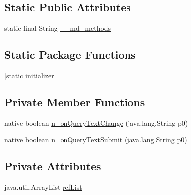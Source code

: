\subsection*{Static Public Attributes}
\begin{CompactItemize}
\item 
static final String \hyperlink{classmd5b60ffeb829f638581ab2bb9b1a7f4f3f_1_1_search_bar_renderer_5f0e642da7b2413e781c8137331a275e}{\_\-\_\-md\_\-methods}
\end{CompactItemize}
\subsection*{Static Package Functions}
\begin{CompactItemize}
\item 
\hyperlink{classmd5b60ffeb829f638581ab2bb9b1a7f4f3f_1_1_search_bar_renderer_ea4b7a40383fa8ec0f5ea4d35a208d21}{\mbox{[}static initializer\mbox{]}}
\end{CompactItemize}
\subsection*{Private Member Functions}
\begin{CompactItemize}
\item 
native boolean \hyperlink{classmd5b60ffeb829f638581ab2bb9b1a7f4f3f_1_1_search_bar_renderer_35b5d784e982cf14b6da8df89ad0d0ee}{n\_\-onQueryTextChange} (java.lang.String p0)
\item 
native boolean \hyperlink{classmd5b60ffeb829f638581ab2bb9b1a7f4f3f_1_1_search_bar_renderer_abe14e5f9bd2010409ee2224b5066103}{n\_\-onQueryTextSubmit} (java.lang.String p0)
\end{CompactItemize}
\subsection*{Private Attributes}
\begin{CompactItemize}
\item 
java.util.ArrayList \hyperlink{classmd5b60ffeb829f638581ab2bb9b1a7f4f3f_1_1_search_bar_renderer_0f1acb862b764a09166bdf7a4a2c1e4a}{refList}
\end{CompactItemize}


